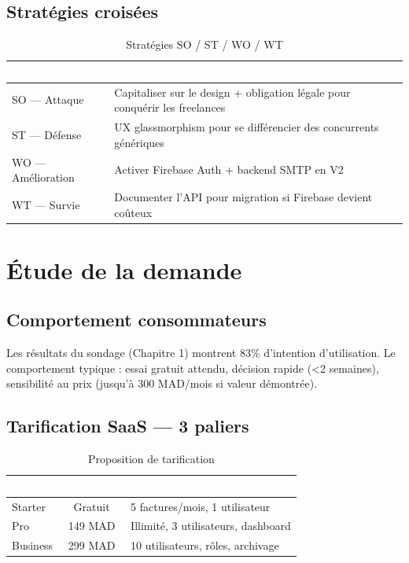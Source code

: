 \subsection{Stratégies croisées}

\begin{table}[H]
\centering
\caption{Stratégies SO / ST / WO / WT}
\label{tab:strategies_swot}
\begin{tabularx}{\textwidth}{|l|X|}
\hline
\rowcolor{emsiblue}\textcolor{white}{\textbf{Stratégie}} & \textcolor{white}{\textbf{Action concrète}} \\
\hline
SO — Attaque & Capitaliser sur le design + obligation légale pour conquérir les freelances \\
ST — Défense & UX glassmorphism pour se différencier des concurrents génériques \\
WO — Amélioration & Activer Firebase Auth + backend SMTP en V2 \\
WT — Survie & Documenter l'API pour migration si Firebase devient coûteux \\
\hline
\end{tabularx}
\end{table}

\section{Étude de la demande}

\subsection{Comportement consommateurs}

Les résultats du sondage (Chapitre 1) montrent 83\% d'intention d'utilisation. Le comportement typique : essai gratuit attendu, décision rapide (\textless 2 semaines), sensibilité au prix (jusqu'à 300 MAD/mois si valeur démontrée).

\subsection{Tarification SaaS — 3 paliers}

\begin{table}[H]
\centering
\caption{Proposition de tarification}
\label{tab:tarification}
\begin{tabular}{|l|c|l|}
\hline
\rowcolor{emsiblue}\textcolor{white}{\textbf{Plan}} & \textcolor{white}{\textbf{Prix/mois}} & \textcolor{white}{\textbf{Fonctionnalités}} \\
\hline
Starter & Gratuit & 5 factures/mois, 1 utilisateur \\
Pro & 149 MAD & Illimité, 3 utilisateurs, dashboard \\
Business & 299 MAD & 10 utilisateurs, rôles, archivage \\
\hline
\end{tabular}
\end{table}

